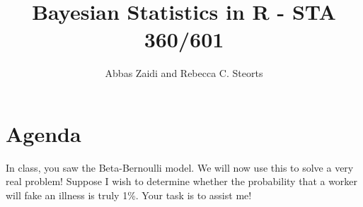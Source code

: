\documentclass{article}
\begin{document}
\title{Bayesian Statistics in \textsf{R} - STA 360/601}
\author{Abbas Zaidi and Rebecca C. Steorts}
\date{}
\maketitle


\section{Agenda}

In class, you saw the Beta-Bernoulli model. We will now use this to solve a very real problem! Suppose I wish to determine whether the probability that a worker will fake an illness is truly 1\%. Your task is to assist me!
\end{document}
